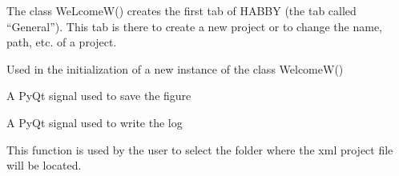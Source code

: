 \documentclass[letterpaper,10pt,english]{sphinxmanual}
\begin{document}
\begin{fulllineitems}
\label{\detokenize{index:src_GUI.Main_windows_1.WelcomeW}}
The class WeLcomeW()  creates the first tab of HABBY (the tab called “General”). This tab is there to create
a new project or to change the name, path, etc. of a project.

\begin{fulllineitems}
\label{\detokenize{index:src_GUI.Main_windows_1.WelcomeW.init_iu}}
Used in the initialization of a new instance of the class WelcomeW()

\end{fulllineitems}


\begin{fulllineitems}
\label{\detokenize{index:src_GUI.Main_windows_1.WelcomeW.save_signal}}
A PyQt signal used to save the figure

\end{fulllineitems}


\begin{fulllineitems}
\label{\detokenize{index:src_GUI.Main_windows_1.WelcomeW.send_log}}
A PyQt signal used to write the log

\end{fulllineitems}


\begin{fulllineitems}
\label{\detokenize{index:src_GUI.Main_windows_1.WelcomeW.setfolder}}
This function is used by the user to select the folder where the xml project file will be located.

\end{fulllineitems}


\end{fulllineitems}


\begin{fulllineitems}
\label{\detokenize{index:src_GUI.Main_windows_1.new_project}}
\end{fulllineitems}
\end{document}
